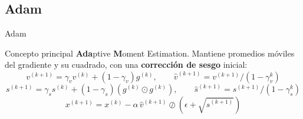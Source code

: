 \subsection{Adam}

\providecommand{\reflibro}[1]{\par\vfill{\tiny\textcolor{GrisTexto!70}{\textit{Ref. libro:} #1}}}

\newcommand{\adamValle}{%
    \foreach \r/\cl in {0.6/niv1, 1.2/niv2, 1.9/niv3, 2.6/niv4, 3.4/niv5, 4.3/niv6, 5.3/niv7}
        \draw[\cl, rotate around={30:(0,0)}] (0,0) ellipse ({\r} and {\r/3.1623});%
}

\begin{frame}{Adam}
    \begin{block}{Concepto principal}
        \footnotesize
        \textbf{Ada}ptive \textbf{M}oment Estimation. Mantiene promedios móviles del gradiente y su cuadrado, con una \textbf{corrección de sesgo} inicial:
        \[ v^{(k+1)}=\gamma_v v^{(k)}+(1-\gamma_v)g^{(k)}, \qquad \hat{v}^{(k+1)}=v^{(k+1)}/(1-\gamma_v^k) \]
        \[ s^{(k+1)}=\gamma_s s^{(k)}+(1-\gamma_s)(g^{(k)}\odot g^{(k)}), \qquad \hat{s}^{(k+1)}=s^{(k+1)}/(1-\gamma_s^k) \]
        \[ x^{(k+1)}=x^{(k)}-\alpha\,\hat{v}^{(k+1)}\oslash(\epsilon+\sqrt{\hat{s}^{(k+1)}}) \]
    \end{block}
\end{frame}


